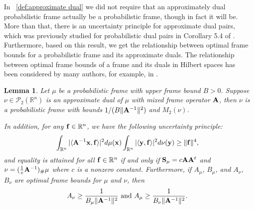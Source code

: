\documentclass{amsart}
\numberwithin{equation}{section}
\theoremstyle{plain}
\newtheorem{lemma}[theorem]{Lemma}
\theoremstyle{remark}
\theoremstyle{definition}
\begin{document}
In ~\cref{def:approximate dual} we did not require that an approximately dual probabilistic frame actually be a probabilistic frame, though in fact it will be. More than that, there is an uncertainty principle for approximate dual pairs, which was previously studied for probabilistic dual pairs in Corollary 5.4 of \cite{chen2024general}. Furthermore, based on this result, we get the relationship between optimal frame bounds for a probabilistic frame and its approximate duals. The relationship between optimal frame bounds of a frame and its duals in Hilbert spaces has been considered by many authors, for example, in  \cite{razghandi2020characterization}.

\begin{lemma}\label{DualIsFrame}
Let $\mu$ be a probabilistic frame with upper frame bound $B>0$.  Suppose $\nu \in \mathcal{P}_2(\mathbb{R}^n)$ is an approximate dual of $\mu$ with mixed frame operator $\bf A$, then $\nu$ is a probabilistic frame with bounds $ 1/(B \| {\bf A}^{-1}\|^2)$ and $M_2(\nu)$. 

In addition, for any ${\bf f} \in \mathbb{R}^n$, we have the following uncertainty principle:
     \begin{equation*}
        \int_{\mathbb{R}^n} |\langle {\bf A }^{-1} {\bf x}, {\bf f} \rangle |^2 d\mu({\bf x}) \int_{\mathbb{R}^n} |\langle {\bf y}, {\bf f} \rangle |^2 d\nu({\bf y})  \geq \| {\bf f} \|^4,
    \end{equation*}
and equality is attained for all ${\bf f} \in \mathbb{R}^n$  if and only if  ${\bf S}_{\mu}=c{\bf A}{\bf A}^{t}$ and
$\nu=(\frac{1}{c}{\bf A}^{-1})_{\#}\mu$ where $c$ is a nonzero constant.
Furthermore, if $A_\mu$, $B_\mu$, and $A_\nu$, $B_\nu$ are optimal frame bounds for $\mu$ and $\nu$, then 
\begin{equation*}
    A_\nu \geq \frac{1}{B_\mu \| {\bf A}^{-1}\|^2} \ \text{and} \  A_\mu \geq \frac{1}{B_\nu \| {\bf A}^{-1}\|^2}.
\end{equation*}
\end{lemma}
\end{document}
